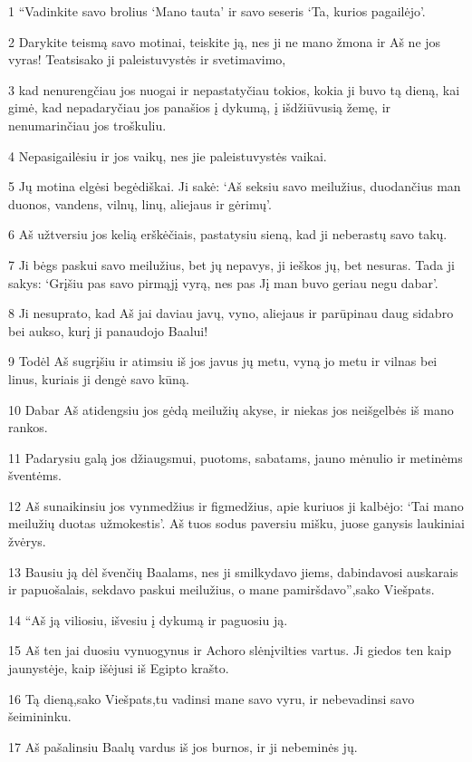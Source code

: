 \par 1 “Vadinkite savo brolius ‘Mano tauta’ ir savo seseris ‘Ta, kurios pagailėjo’. 
\par 2 Darykite teismą savo motinai, teiskite ją, nes ji ne mano žmona ir Aš ne jos vyras! Teatsisako ji paleistuvystės ir svetimavimo, 
\par 3 kad nenurengčiau jos nuogai ir nepastatyčiau tokios, kokia ji buvo tą dieną, kai gimė, kad nepadaryčiau jos panašios į dykumą, į išdžiūvusią žemę, ir nenumarinčiau jos troškuliu. 
\par 4 Nepasigailėsiu ir jos vaikų, nes jie paleistuvystės vaikai. 
\par 5 Jų motina elgėsi begėdiškai. Ji sakė: ‘Aš seksiu savo meilužius, duodančius man duonos, vandens, vilnų, linų, aliejaus ir gėrimų’. 
\par 6 Aš užtversiu jos kelią erškėčiais, pastatysiu sieną, kad ji neberastų savo takų. 
\par 7 Ji bėgs paskui savo meilužius, bet jų nepavys, ji ieškos jų, bet nesuras. Tada ji sakys: ‘Grįšiu pas savo pirmąjį vyrą, nes pas Jį man buvo geriau negu dabar’. 
\par 8 Ji nesuprato, kad Aš jai daviau javų, vyno, aliejaus ir parūpinau daug sidabro bei aukso, kurį ji panaudojo Baalui! 
\par 9 Todėl Aš sugrįšiu ir atimsiu iš jos javus jų metu, vyną jo metu ir vilnas bei linus, kuriais ji dengė savo kūną. 
\par 10 Dabar Aš atidengsiu jos gėdą meilužių akyse, ir niekas jos neišgelbės iš mano rankos. 
\par 11 Padarysiu galą jos džiaugsmui, puotoms, sabatams, jauno mėnulio ir metinėms šventėms. 
\par 12 Aš sunaikinsiu jos vynmedžius ir figmedžius, apie kuriuos ji kalbėjo: ‘Tai mano meilužių duotas užmokestis’. Aš tuos sodus paversiu mišku, juose ganysis laukiniai žvėrys. 
\par 13 Bausiu ją dėl švenčių Baalams, nes ji smilkydavo jiems, dabindavosi auskarais ir papuošalais, sekdavo paskui meilužius, o mane pamiršdavo”,­sako Viešpats. 
\par 14 “Aš ją viliosiu, išvesiu į dykumą ir paguosiu ją. 
\par 15 Aš ten jai duosiu vynuogynus ir Achoro slėnį­vilties vartus. Ji giedos ten kaip jaunystėje, kaip išėjusi iš Egipto krašto. 
\par 16 Tą dieną,­sako Viešpats,­tu vadinsi mane savo vyru, ir nebevadinsi savo šeimininku. 
\par 17 Aš pašalinsiu Baalų vardus iš jos burnos, ir ji nebeminės jų. 
